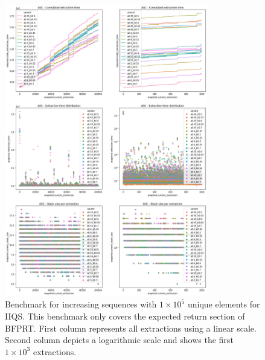 \begin{figure}[p]
    \centering
    \includegraphics[width=0.79\textwidth]{./fragments/04_experimental_execution/images/04_alphabeta_detail_increasing_inner.png}
    \caption{Benchmark for increasing sequences with $1\times10^5$ unique elements for IIQS. This benchmark only covers the expected return section of BFPRT. First column represents all extractions using a linear scale. Second column depicts a logarithmic scale and shows the first $1\times10^3$ extractions. }
    \label{FIG:05_ALPHABETA_BENCHMARK_ASC_INNER}
\end{figure}

